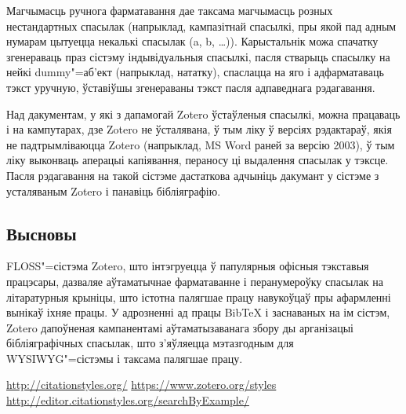 \documentclass[10pt, a5paper]{article}
\begin{document}
Магчымасць ручнога фарматавання дае таксама магчымасць розных нестандартных спасылак (напрыклад, кампазітнай спасылкі, пры якой пад адным нумарам цытуецца некалькі спасылак (a, b, \ldots{})). Карыстальнік можа спачатку згенераваць праз сістэму індывідуальныя спасылкі, пасля стварыць спасылку на нейкі dummy"=аб’ект (напрыклад, нататку), спаслацца на яго і адфарматаваць тэкст уручную, ўставіўшы згенераваны тэкст пасля адпаведнага рэдагавання.

Над дакументам, у які з дапамогай Zotero ўстаўленыя спасылкі, можна працаваць і на кампутарах, дзе Zotero не ўсталявана, ў тым ліку ў версіях рэдактараў, якія не падтрымліваюцца Zotero (напрыклад, MS Word раней за версію 2003), ў тым ліку выконваць аперацыі капіявання, пераносу ці выдалення спасылак у тэксце. Пасля рэдагавання на такой сістэме дастаткова адчыніць дакумант у сістэме з усталяваным Zotero і панавіць бібліяграфію.

\subsection*{Высновы}

FLOSS"=сістэма Zotero, што інтэгруецца ў папулярныя офісныя тэкставыя працэсары, дазваляе аўтаматычнае фарматаванне і перанумероўку спасылак на літаратурныя крыніцы, што істотна палягшае працу навукоўцаў пры афармленні вынікаў іхняе працы. У адрозненні ад працы BibTeX і заснаваных на ім сістэм, Zotero дапоўненая кампанентамі аўтаматызаванага збору ды арганізацыі бібліяграфічных спасылак, што з’яўляецца мэтазгодным для \linebreak WYSIWYG"=сістэмы і таксама палягшае працу.

\begin{thebibliography}{9}
 \url{http://citationstyles.org/}
 \url{https://www.zotero.org/styles}
 \url{http://editor.citationstyles.org/searchByExample/}
\end{thebibliography}
\end{document}
